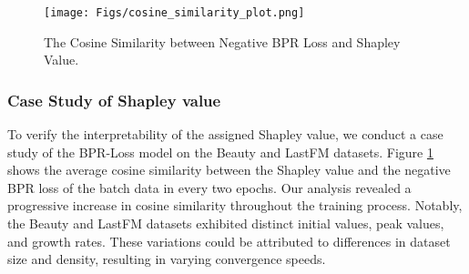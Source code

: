\begin{figure}[h]
    \centering
    \texttt{[image: Figs/cosine\_similarity\_plot.png]}
    \caption{The Cosine Similarity between Negative BPR Loss and Shapley Value.}
    \label{fig:case_study}
\end{figure}

\subsubsection{Case Study of Shapley value}
To verify the interpretability of the assigned Shapley value, we conduct a case study of the BPR-Loss model on the Beauty and LastFM datasets. Figure \ref{fig:case_study} shows the average cosine similarity between the Shapley value and the negative BPR loss of the batch data in every two epochs. Our analysis revealed a progressive increase in cosine similarity throughout the training process. Notably, the Beauty and LastFM datasets exhibited distinct initial values, peak values, and growth rates. These variations could be attributed to differences in dataset size and density, resulting in varying convergence speeds.
